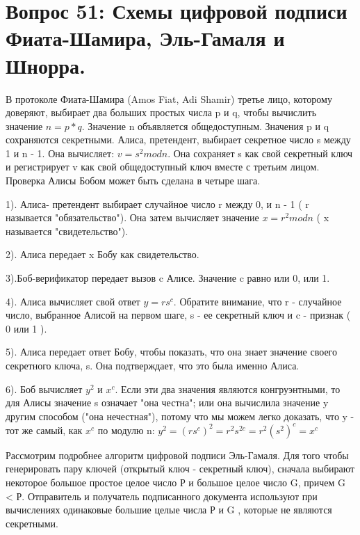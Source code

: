 \section{Вопрос 51: Схемы цифровой подписи Фиата-Шамира, Эль-Гамаля и Шнорра.}


В протоколе Фиата-Шамира (Amos Fiat, Adi Shamir) третье лицо, которому доверяют, выбирает два больших простых числа p и q, чтобы вычислить значение $n = p * q$. Значение n объявляется общедоступным. Значения p и q сохраняются секретными. Алиса, претендент, выбирает секретное число s между 1 и n - 1. Она вычисляет: $v = s^{2}mod n$. Она сохраняет s как свой секретный ключ и регистрирует v как свой общедоступный ключ вместе с третьим лицом. Проверка Алисы Бобом может быть сделана в четыре шага.

1). Алиса- претендент выбирает случайное число r между 0, и n - 1 ( r называется "обязательство"). Она затем вычисляет значение $x = r^{2}mod n$ ( x называется "свидетельство").

2). Алиса передает x Бобу как свидетельство.

3).Боб-верификатор передает вызов c Алисе. Значение c равно или 0, или 1.

4). Алиса вычисляет свой ответ $y = rs^{c}$. Обратите внимание, что r - случайное число, выбранное Алисой на первом шаге, s - ее секретный ключ и c - признак ( 0 или 1 ).

5). Алиса передает ответ Бобу, чтобы показать, что она знает значение своего секретного ключа, s. Она подтверждает, что это была именно Алиса.

6). Боб вычисляет $y^{2}$ и $x^{c}$. Если эти два значения являются конгруэнтными, то для Алисы значение s означает "она честна"; или она вычислила значение y другим способом ("она нечестная"), потому что мы можем легко доказать, что y - тот же самый, как $x^{c}$ по модулю n:  $ y^{2} = (rs^{c})^2 = r^{2}s^{2c} = r^{2}(s^2)^{c} = x^{c}$


Рассмотрим подробнее алгоритм цифровой подписи Эль-Гамаля. Для того чтобы генерировать пару ключей (открытый ключ - секретный ключ), сначала выбирают некоторое большое простое целое число Р и большое целое число G, причем G < Р. Отправитель и получатель подписанного документа используют при вычислениях одинаковые большие целые числа Р  и G , которые не являются секретными.

